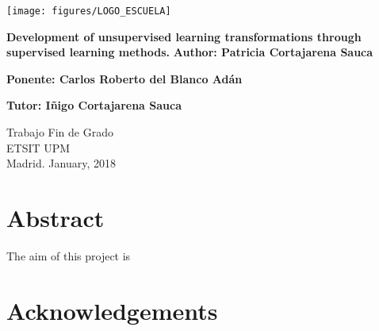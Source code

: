 \documentclass[a4paper,11pt,spanish]{report}
\newcommand{\linespacing}{1.5}
\renewcommand{\baselinestretch}{\linespacing}
\begin{document}
\raggedbottom


\thispagestyle{empty}
\begin{flushright}
\texttt{[image: figures/LOGO\_ESCUELA]}
\end{flushright}
\vskip40mm
\begin{center}
\huge\textbf{Development of unsupervised learning transformations through supervised learning methods.}
\vskip2mm
\LARGE\textit{}
\vskip5mm
\Large\textbf{Author: Patricia Cortajarena Sauca}

\Large\textbf{Ponente: Carlos Roberto del Blanco Adán}

\Large\textbf{Tutor: Iñigo Cortajarena Sauca}

\end{center}
\vfill
\begin{flushleft}
\large
Trabajo Fin de Grado \\
ETSIT UPM 	\\
Madrid. January, 2018
\end{flushleft}

\chapter*{Abstract}
\setcounter{page}{3}

The aim of this project is  


\chapter*{Acknowledgements}

\renewcommand{\baselinestretch}{\linespacing}
\small\normalsize

\newpage
{}
\tableofcontents
\listoftables
{}
{}
\listoffigures
{}
{}
\end{document}
